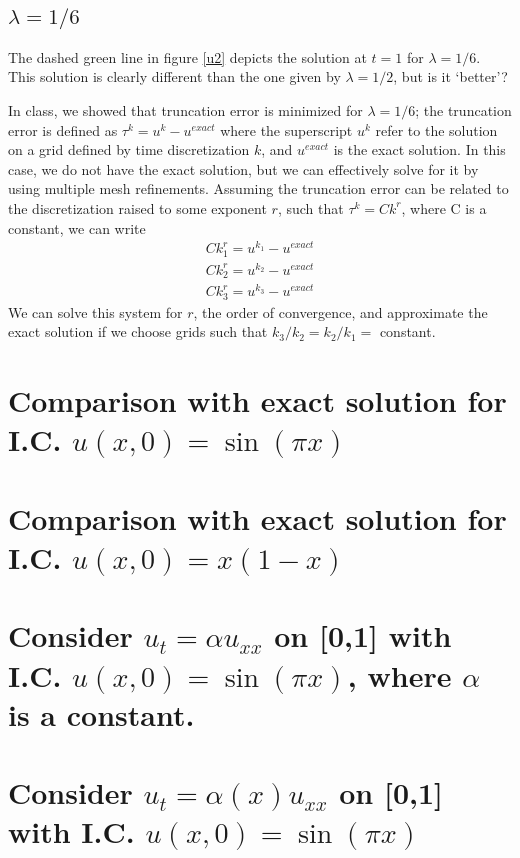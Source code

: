 \documentclass[11pt]{amsart}
\begin{document}
\subsection{$\lambda = 1/6$} 
The dashed green line in figure \ref{u2} depicts the solution at $t=1$ for $\lambda =1/6$. This solution is clearly different than the one given by $\lambda =1/2$, but is it `better'? 

In class, we showed that truncation error is minimized for $\lambda = 1/6$;  the truncation error is defined as $\tau^k = u^{k} - u^{exact}$ where the superscript $u^k$ refer to the solution on a grid defined by time discretization $k$, and $u^{exact}$ is the exact solution. In this case, we do not have the exact solution, but we can effectively solve for it by using multiple mesh refinements. Assuming the truncation error can be related to the discretization raised to some exponent $r$, such that $\tau^k = Ck^r$, where C is a constant, we can write  
\begin{eqnarray} 
Ck_1^r= u^{k_1} - u^{exact}\\
Ck_2^r = u^{k_2} - u^{exact}\\
Ck_3^r = u^{k_3} - u^{exact}
\end{eqnarray} 
We can solve this system for $r$, the order of convergence, and approximate the exact solution if we choose grids such that $k_3/k_2 = k_2/k_1 =$ constant.

\section{Comparison with exact solution for  I.C. $u(x,0)= \sin(\pi x)$} 

\section{Comparison with exact solution for  I.C. $u(x,0)= x(1-x)$} 

\section{Consider $u_t = \alpha u_{xx}$ on [0,1] with I.C. $u(x,0)= \sin(\pi x)$, where $\alpha$ is a constant. }


\section{Consider $u_t = \alpha(x) u_{xx}$ on [0,1] with I.C. $u(x,0)= \sin(\pi x)$ }
\end{document}
